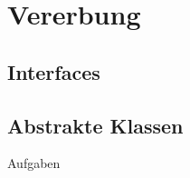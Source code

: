 
\chapter{Vererbung}

\section{Interfaces}

\section{Abstrakte Klassen}

\begin{xcb}{Aufgaben}

\end{xcb}